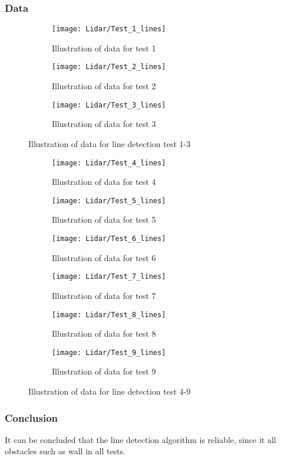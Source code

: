 \documentclass[../Head/Main.tex]{subfiles}
\begin{document}
\subsubsection*{Data}
\begin{figure}[H]
  \begin{subfigure}[b]{0.3\textwidth}
  	\centering
    \texttt{[image: Lidar/Test\_1\_lines]}
    \caption{Illustration of data for test 1}
    \label{fig:Linestest1}
  \end{subfigure}
  \hfill
  \begin{subfigure}[b]{0.3\textwidth}
  	\centering
    \texttt{[image: Lidar/Test\_2\_lines]}
    \caption{Illustration of data for test 2}
    \label{fig:Linestest2}
  \end{subfigure}
  \hfill
  \begin{subfigure}[b]{0.3\textwidth}
    \centering
    \texttt{[image: Lidar/Test\_3\_lines]}
    \caption{Illustration of data for test 3}
    \label{fig:Linestest3}
  \end{subfigure}
  \caption{Illustration of data for line detection test 1-3}
  \label{fig:Linestests13}
\end{figure}
\begin{figure}[H]
  \begin{subfigure}[b]{0.3\textwidth}
    \centering
    \texttt{[image: Lidar/Test\_4\_lines]}
    \caption{Illustration of data for test 4}
    \label{fig:Linestest4}
  \end{subfigure}
  \hfill
  \begin{subfigure}[b]{0.3\textwidth}
    \centering
    \texttt{[image: Lidar/Test\_5\_lines]}
    \caption{Illustration of data for test 5}
    \label{fig:Linestest5}
  \end{subfigure}
  \hfill
  \begin{subfigure}[b]{0.3\textwidth}
    \centering
    \texttt{[image: Lidar/Test\_6\_lines]}
    \caption{Illustration of data for test 6}
    \label{fig:Linestest6}
  \end{subfigure}
  \hfill
  \begin{subfigure}[b]{0.3\textwidth}
    \centering
    \texttt{[image: Lidar/Test\_7\_lines]}
    \caption{Illustration of data for test 7}
    \label{fig:Linestest7}
  \end{subfigure}
  \hfill
  \begin{subfigure}[b]{0.3\textwidth}
    \centering
    \texttt{[image: Lidar/Test\_8\_lines]}
    \caption{Illustration of data for test 8}
    \label{fig:Linestest8}
  \end{subfigure}
  \hfill
  \begin{subfigure}[b]{0.3\textwidth}
    \centering
    \texttt{[image: Lidar/Test\_9\_lines]}
    \caption{Illustration of data for test 9}
    \label{fig:Linestest9}
  \end{subfigure}
  \caption{Illustration of data for line detection test 4-9}
  \label{fig:Linestests49}
\end{figure}

\subsubsection*{Conclusion}
It can be concluded that the line detection algorithm is reliable, since it all obstacles such as wall in all tests. 
\end{document}
